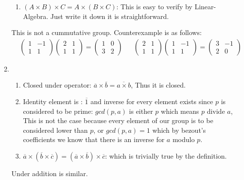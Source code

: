 \documentclass{article}
\begin{document}
\begin{itemize}
\begin{enumerate}[label=(\alph*)]
\begin{enumerate}[label=(\Roman*)]
				  \item 
					$(A \times B) \times C = A \times (B \times C)$: This is easy to verify by Linear-Algebra. Just write it down 
					it is straightforward.
			  \end{enumerate}
			  This is not a cummutative group. Counterexample is as follows:
			  \begin{align*}
				&\left(\begin{matrix} 1 & -1 \\ 1 & 1 \end{matrix}\right) \left(\begin{matrix} 2 & 1 \\ 1 & 1 \end{matrix}\right)
				= \left(\begin{matrix} 1 & 0 \\ 3 & 2 \end{matrix}\right)
				&&
				\left(\begin{matrix} 2 & 1 \\ 1 & 1 \end{matrix}\right) \left(\begin{matrix} 1 & -1 \\ 1 & 1 \end{matrix}\right)=
				\left(\begin{matrix} 3 & -1 \\ 2 & 0 \end{matrix}\right)	
			  \end{align*}

			\item
				  \begin{enumerate}[label=(\Roman*)]
					  \item Closed under operator: $\overline{a} \times  \overline{b} = \overline{a \times b}$, Thus it is closed.
					  \item Identity element is : $\overline{1}$ and inverse for every element exists since $p$ is considered to be prime:
						$gcd(p, a)$ is either $p$ which means $p$ divide $a$, This is not the case because every element of our 
						group is to be considered lower than $p$, or $gcd(p,a)=1$ which by bezout's coefficients we know that 
						there is an inverse for $a$ modulo $p$.
					\item $\overline{a} \times \left(\overline{b} \times \overline{c}\right) = \left(\overline{a} \times \overline{b}\right) \times \overline{c}$: which is trivially true by the definition.\\
				  \end{enumerate}
				  Under addition is similar.


\end{enumerate}
\end{itemize}
\end{document}
